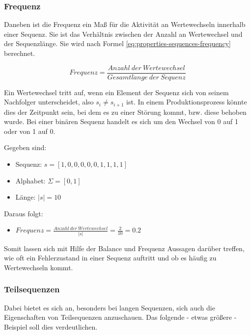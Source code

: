 \subsubsection{Frequenz}
\label{subsection:frequence}
Daneben ist die Frequenz ein Maß für die Aktivität an Wertewechseln innerhalb einer Sequenz. Sie ist das Verhältnis zwischen der Anzahl an Wertewechsel und der Sequenzlänge. Sie wird nach Formel \ref{eq:properties-sequences-frequency} berechnet. 

\begin{equation}
\label{eq:properties-sequences-frequency}
Frequenz = \frac{Anzahl\ der\ Wertewechsel}{Gesamtl\ddot{a}nge\ der\ Sequenz}
\end{equation}

Ein Wertewechsel tritt auf, wenn ein Element der Sequenz sich von seinem Nachfolger unterscheidet, also $s_{i} \neq s_{i+1}$ ist. In einem Produktionsprozess könnte dies der Zeitpunkt sein, bei dem es zu einer Störung kommt, bzw. diese behoben wurde. Bei einer binären Sequenz handelt es sich um den Wechsel von 0 auf 1 oder von 1 auf 0.

\begin{theorem}
Gegeben sind:
\begin{itemize}[noitemsep]
	\item Sequenz: $s = [1,0,0,0,0,0,1,1,1,1]$
	\item Alphabet: $\Sigma = [0,1]$
	\item Länge: $|s| = 10$
\end{itemize}
Daraus folgt:
\begin{itemize}[noitemsep]
	\item [] $Frequenz = \frac{Anzahl\ der\ Wertewechsel}{|s|} = \frac{2}{10} = 0.2$
\end{itemize}
\end{theorem}

Somit lassen sich mit Hilfe der Balance und Frequenz Aussagen darüber treffen, wie oft ein Fehlerzustand in einer Sequenz auftritt und ob es häufig zu Wertewechseln kommt. 

\subsubsection{Teilsequenzen}

Dabei bietet es sich an, besonders bei langen Sequenzen, sich auch die Eigenschaften von Teilsequenzen anzuschauen. Das folgende - etwas größere - Beispiel soll dies verdeutlichen.

